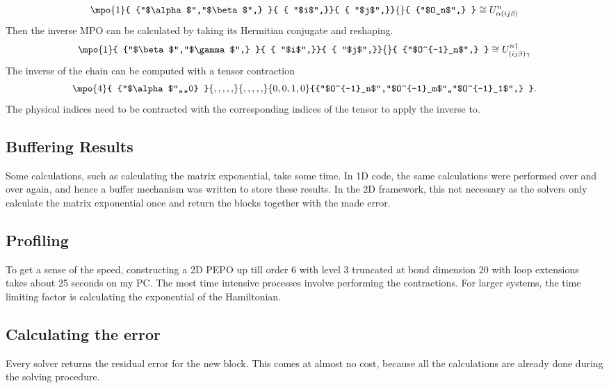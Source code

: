 \begin{equation}
  \mpo{1}{ {"$\alpha$","$\beta$",}  }{ { "$i$",}}{ { "$j$",}}{}{ {"$O_n$",} } \cong U^{n}_{\alpha (i j \beta)}
\end{equation}
Then the inverse \Gls{MPO} can be calculated by taking its Hermitian conjugate and reshaping.
\begin{equation}
  \mpo{1}{ {"$\beta$","$\gamma$",}  }{ { "$i$",}}{ { "$j$",}}{}{ {"$O^{-1}_n$",} } \cong U^{n \dagger}_{ (i j \beta)  \gamma }
\end{equation}
The inverse of the chain can be computed with a tensor contraction
\begin{equation}
  \mpo{4}{ {"$\alpha$",,,,0}  }{ {,,,,,}}{ { ,,,,,}}{{0,0,1,0}}{{"$O^{-1}_n$","$O^{-1}_m$",,"$O^{-1}_1$",} }.
\end{equation}
The physical indices need to be contracted with the corresponding indices of the tensor to apply the inverse to.

\subsection{Buffering Results}

Some calculations, such as calculating the matrix exponential, take some time. In 1D code, the same calculations were performed over and over again, and hence a buffer mechanism was written to store these results. In the 2D framework, this not necessary as the solvers only calculate the matrix exponential once and return the blocks together with the made error.

\subsection{Profiling}
To get a sense of the speed, constructing a 2D \Gls{PEPO} up till order 6 with level 3 truncated at bond dimension 20 with loop extensions takes about 25 seconds on my PC. The most time intensive processes involve performing the contractions. For larger systems, the time limiting factor is calculating the exponential of the Hamiltonian.

\subsection{Calculating the error}

Every solver returns the residual error for the new block. This comes at almost no cost, because all the calculations are already done during the solving procedure.

